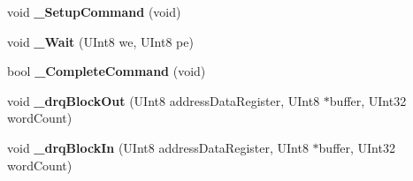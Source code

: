 \begin{DoxyCompactItemize}
void {\bfseries \+\_\+\+Setup\+Command} (void)
\item 
\mbox{\label{class_a_t_a_driver_af1abb7ccb25080d5d5800f8ab8d9eefb}} 
void {\bfseries \+\_\+\+Wait} (U\+Int8 we, U\+Int8 pe)
\item 
\mbox{\label{class_a_t_a_driver_aaf8eaa3f5495338155371dfd7d602bca}} 
bool {\bfseries \+\_\+\+Complete\+Command} (void)
\item 
\mbox{\label{class_a_t_a_driver_a10ce5d2f8ea48bbc45d7cee8dac57312}} 
void {\bfseries \+\_\+drq\+Block\+Out} (U\+Int8 address\+Data\+Register, U\+Int8 $\ast$buffer, U\+Int32 word\+Count)
\item 
\mbox{\label{class_a_t_a_driver_a2dd7b6d944cd27bcf5826db3c38d1fae}} 
void {\bfseries \+\_\+drq\+Block\+In} (U\+Int8 address\+Data\+Register, U\+Int8 $\ast$buffer, U\+Int32 word\+Count)
\end{DoxyCompactItemize}
